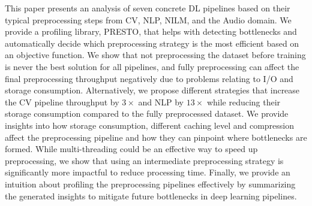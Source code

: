 This paper presents an analysis of seven concrete DL pipelines based on their typical preprocessing steps from CV, NLP, NILM, and the Audio domain.
We provide a profiling library, PRESTO, that helps with detecting bottlenecks and automatically decide which preprocessing strategy is the most efficient based on an {\color{diff2}objective function}.
We show that not preprocessing the dataset before training is never the best solution for all pipelines, and fully preprocessing can affect the final preprocessing throughput negatively due to problems relating to I/O and storage consumption.
Alternatively, we propose different strategies that increase the CV pipeline throughput by {\color{diff2}$3\times$ and NLP by $13\times$} while reducing their storage consumption compared to the fully preprocessed dataset.
We provide insights into how storage consumption, {\color{diff2}different caching level and compression affect} the preprocessing pipeline and how they can pinpoint where bottlenecks are formed.
While multi-threading could be an effective way to speed up preprocessing, we show that using an intermediate preprocessing strategy is significantly more impactful to reduce processing time.
Finally, we provide an intuition about profiling the preprocessing pipelines effectively by summarizing the generated insights to mitigate future bottlenecks in deep learning pipelines.


